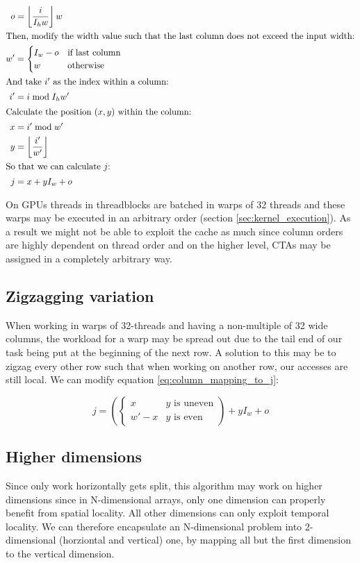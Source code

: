 \begin{align}
    o  &= \left\lfloor \frac{i}{I_h w} \right\rfloor w
    \\ \intertext{Then, modify the width value such that the last column does not exceed the input width:}
    w' &= \begin{cases}
        I_w - o& \text{if last column}
        \\
        w & \text{otherwise}
    \end{cases}
    \\ \intertext{And take $i'$ as the index within a column:}
    i' &= i \bmod I_h w'
    \\ \intertext{Calculate the position $(x, y)$ within the column:}
    x & = i' \bmod w'
    \\ 
    y & = \left\lfloor \frac{i'}{w'} \right\rfloor
    \\ \intertext{So that we can calculate $j$:}
    \label{eq:column_mapping_to_j}
    j  &= x + y I_w + o
\end{align}

On GPUs threads in threadblocks are batched in warps of 32 threads and these warps may be executed in an arbitrary order (section \ref{sec:kernel_execution}).
As a result we might not be able to exploit the cache as much since column orders are highly dependent on thread order and on the higher level, CTAs may be assigned in a completely arbitrary way.

\subsection{Zigzagging variation}
When working in warps of 32-threads and having a non-multiple of 32 wide columns, the workload for a warp may be spread out due to the tail end of our task being put at the beginning of the next row.
A solution to this may be to zigzag every other row such that when working on another row, our accesses are still local.
We can modify equation \ref{eq:column_mapping_to_j}:

\begin{equation}
    j = \left(\begin{cases}
        x & y \text{ is uneven}
        \\
        w' - x & y \text{ is even}
    \end{cases}\right)  + y I_w + o
\end{equation}

\subsection{Higher dimensions}
Since only work horizontally gets split, this algorithm may work on higher dimensions since in N-dimensional arrays, only one dimension can properly benefit from spatial locality.
All other dimensions can only exploit temporal locality.
We can therefore encapsulate an N-dimensional problem into 2-dimensional (horziontal and vertical) one, by mapping all but the first dimension to the vertical dimension.

